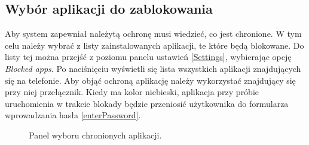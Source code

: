 \subsection{Wybór aplikacji do zablokowania}
Aby system zapewniał należytą ochronę musi wiedzieć, co jest chronione. W tym celu należy wybrać z listy zainstalowanych aplikacji, te które będą blokowane. Do listy tej można przejść z poziomu panelu ustawień \ref{Settings}, wybierając opcję \textit{Blocked apps}. Po naciśnięciu wyświetli się lista wszystkich aplikacji znajdujących się na telefonie. Aby objąć ochroną aplikację należy wykorzystać znajdujący się przy niej przełącznik. Kiedy ma kolor niebieski, aplikacja przy próbie uruchomienia w trakcie blokady będzie przeniosić użytkownika do formularza wprowadzania hasła \ref{enterPassword}.
\begin{figure}[H]
    \begin{center}
        \setlength{\fboxsep}{0pt}%
        \setlength{\fboxrule}{0.3pt}%
    \end{center}
    \caption{{\color{dgray}Panel wyboru chronionych aplikacji.}} \label{appList}
\end{figure}
